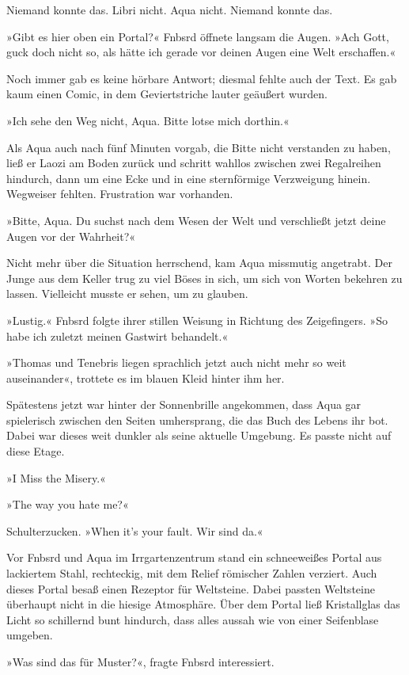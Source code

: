 Niemand konnte das. Libri nicht. Aqua nicht. Niemand konnte das.

»Gibt es hier oben ein Portal?« Fnbsrd öffnete langsam die Augen. »Ach Gott, guck doch nicht so, als hätte ich gerade vor deinen Augen eine Welt erschaffen.«

Noch immer gab es keine hörbare Antwort; diesmal fehlte auch der Text. Es gab kaum einen Comic, in dem Geviertstriche lauter geäußert wurden.

»Ich sehe den Weg nicht, Aqua. Bitte lotse mich dorthin.«

Als Aqua auch nach fünf Minuten vorgab, die Bitte nicht verstanden zu haben, ließ er Laozi am Boden zurück und schritt wahllos zwischen zwei Regalreihen hindurch, dann um eine Ecke und in eine sternförmige Verzweigung hinein. Wegweiser fehlten. Frustration war vorhanden.

»Bitte, Aqua. Du suchst nach dem Wesen der Welt und verschließt jetzt deine Augen vor der Wahrheit?«

Nicht mehr über die Situation herrschend, kam Aqua missmutig angetrabt. Der Junge aus dem Keller trug zu viel Böses in sich, um sich von Worten bekehren zu lassen. Vielleicht musste er sehen, um zu glauben.

»Lustig.« Fnbsrd folgte ihrer stillen Weisung in Richtung des Zeigefingers. »So habe ich zuletzt meinen Gastwirt behandelt.«

»Thomas und Tenebris liegen sprachlich jetzt auch nicht mehr so weit auseinander«, trottete es im blauen Kleid hinter ihm her.

Spätestens jetzt war hinter der Sonnenbrille angekommen, dass Aqua gar spielerisch zwischen den Seiten umhersprang, die das Buch des Lebens ihr bot. Dabei war dieses weit dunkler als seine aktuelle Umgebung. Es passte nicht auf diese Etage.

»I Miss the Misery.«

»The way you hate me?«

Schulterzucken. »When it's your fault. Wir sind da.«

Vor Fnbsrd und Aqua im Irrgartenzentrum stand ein schneeweißes Portal aus lackiertem Stahl, rechteckig, mit dem Relief römischer Zahlen verziert. Auch dieses Portal besaß einen Rezeptor für Weltsteine. Dabei passten Weltsteine überhaupt nicht in die hiesige Atmosphäre. Über dem Portal ließ Kristallglas das Licht so schillernd bunt hindurch, dass alles aussah wie von einer Seifenblase umgeben.

»Was sind das für Muster?«, fragte Fnbsrd interessiert.


